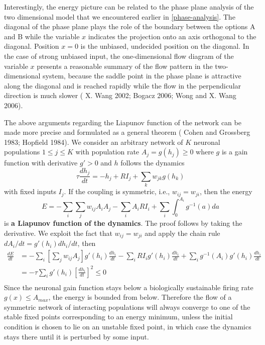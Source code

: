 \documentclass[12pt,hyperref,a4paper,UTF8]{ctexart}
\begin{document}
Interestingly, the energy picture can be related to the phase plane analysis of the two dimensional model that we encountered earlier in \autoref{phase-analysis}. The diagonal of the phase plane plays the role of the boundary between the options A and B while the variable $x$ indicates the projection onto an axis orthogonal to the diagonal. Position $x = 0$ is the unbiased, undecided position on the diagonal. In the case of strong unbiased input, the one-dimensional flow diagram of the variable $x$ presents a reasonable summary of the flow pattern in the two-dimensional system, because the saddle point in the phase plane is attractive along the diagonal and is reached rapidly while the flow in the perpendicular direction is much slower (\cite{X. Wang 2002} X. Wang 2002; \cite{Bogacz 2006} Bogacz 2006; \cite{Wong and X. Wang 2006} Wong and X. Wang 2006).

The above arguments regarding the Liapunov function of the network can be made more precise and formulated as a general theorem (\cite{Cohen and Grossberg 1983} Cohen and Grossberg 1983; \cite{Hopfield 1984} Hopfield 1984). We consider an arbitrary network of $K$ neuronal populations $1 \leq j \leq K$ with population rate $A_j = g(h_j) \geq 0$ where $g$ is a gain function with derivative $g' > 0$ and $h$ follows the dynamics
$$\tau\frac{dh_j}{dt}=-h_j+RI_j+\sum\limits_k w_{jk}g(h_k)$$
with fixed inputs $I_j$. If the coupling is symmetric, i.e., $w_{ij} = w_{ji}$, then the energy
$$E=-\sum\limits_i\sum\limits_j w_{ij} A_i A_j-\sum\limits_i A_i RI_i+\sum\limits_i\int_{0}^{A_i}g^{-1}(a)da$$
is \textbf{a Liapunov function of the dynamics}. The proof follows by taking the derivative. We exploit the fact that $w_{ij} = w_{ji}$ and apply the chain rule $dA_i/dt = g'(h_i)dh_i/dt$, then 
\begin{equation*}
    \begin{aligned}
        \frac{dE}{dt}&=-\sum\limits_i \left[\sum\limits_j w_{ij}A_j\right]g'(h_i)\frac{dh_i}{dt}-\sum\limits_i RI_ig'(h_i)\frac{dh_i}{dt}+\sum\limits_i g^{-1}(A_i)g'(h_i)\frac{dh_i}{dt}\\
        &=-\tau \sum\limits_i g'(h_i)\left[\frac{dh_i}{dt}\right]^2 \leq 0 \\
    \end{aligned}
\end{equation*}
Since the neuronal gain function stays below a biologically sustainable firing rate $g(x) \leq A_{max}$, the energy is bounded from below. Therefore the flow of a symmetric network of interacting populations will always converge to one of the stable fixed points corresponding to an energy minimum, unless the initial condition is chosen to lie on an unstable fixed point, in which case the dynamics stays there until it is perturbed by some input.
\end{document}
